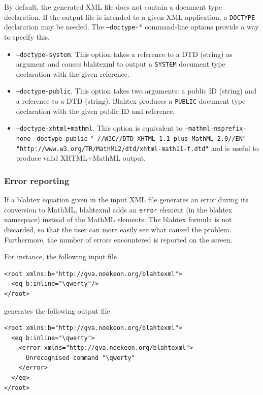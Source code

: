 \documentclass{article}
\begin{document}
By default, the generated XML file does not contain a document type declaration. If the output file is intended to a given XML application, a \texttt{DOCTYPE} declaration may be needed. The \texttt{--doctype-}* command-line options provide a way to specify this.

\begin{itemize}
\item \texttt{--doctype-system}. This option takes a reference to a DTD (string) as argument and causes blahtexml to output a \texttt{SYSTEM} document type declaration with the given reference.
\item \texttt{--doctype-public}. This option takes two arguments: a public ID (string) and a reference to a DTD (string). Blahtex produces a \texttt{PUBLIC} document type declaration with the given public ID and reference.
\item \texttt{--doctype-xhtml+mathml}. This option is equivalent to \texttt{--mathml-nsprefix-none} \texttt{--doctype-public} \texttt{"-//W3C//DTD XHTML 1.1 plus MathML 2.0//EN"}
\newline
\texttt{"http://www.w3.org/TR/MathML2/dtd/xhtml-math11-f.dtd"} and is useful to produce valid XHTML+MathML output.
\end{itemize}

\subsubsection{Error reporting}

If a blahtex equation given in the input XML file generates an error during its conversion to MathML, blahtexml adds an \texttt{error} element (in the blahtex namespace) instead of the MathML elements. The blahtex formula is not discarded, so that the user can more easily see what caused the problem. Furthermore, the number of errors encountered is reported on the screen.

For instance, the following input file
\begin{verbatim}
<root xmlns:b="http://gva.noekeon.org/blahtexml">
  <eq b:inline="\qwerty"/>
</root>
\end{verbatim}
generates the following output file
\begin{verbatim}
<root xmlns:b="http://gva.noekeon.org/blahtexml">
  <eq b:inline="\qwerty">
    <error xmlns="http://gva.noekeon.org/blahtexml">
      Unrecognised command "\qwerty"
    </error>
  </eq>
</root>
\end{verbatim}
\end{document}
